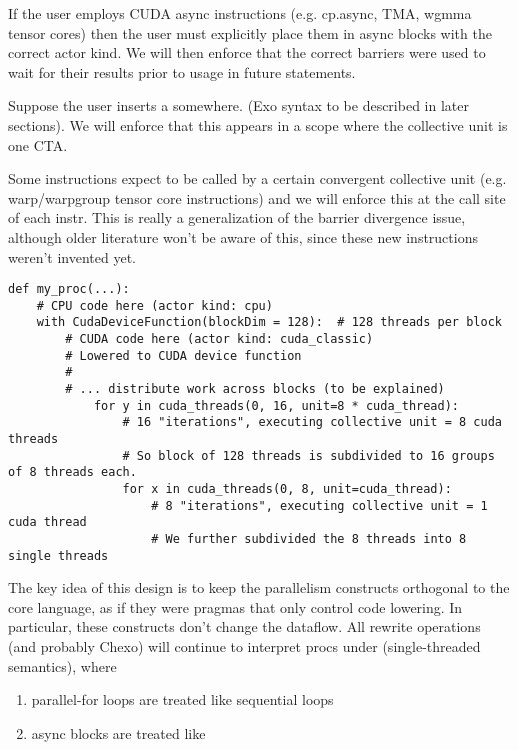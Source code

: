 \filbreak
{} If the user employs CUDA async instructions (e.g. cp.async, TMA, wgmma tensor cores) then the user must explicitly place them in async blocks with the correct actor kind.
We will then enforce that the correct barriers were used to wait for their results prior to usage in future statements.

\filbreak
{} Suppose the user inserts a  somewhere.
(Exo syntax to be described in later sections).
We will enforce that this appears in a scope where the collective unit is one CTA.

\filbreak
{} Some instructions expect to be called by a certain convergent collective unit (e.g. warp/warpgroup tensor core instructions) and we will enforce this at the call site of each instr.
This is really a generalization of the barrier divergence issue, although older literature won't be aware of this, since these new instructions weren't invented yet.

\filbreak
{}
{\color{lightttColor}
\begin{verbatim}
def my_proc(...):
    # CPU code here (actor kind: cpu)
    with CudaDeviceFunction(blockDim = 128):  # 128 threads per block
        # CUDA code here (actor kind: cuda_classic)
        # Lowered to CUDA device function
        #
        # ... distribute work across blocks (to be explained)
            for y in cuda_threads(0, 16, unit=8 * cuda_thread):
                # 16 "iterations", executing collective unit = 8 cuda threads
                # So block of 128 threads is subdivided to 16 groups of 8 threads each.
                for x in cuda_threads(0, 8, unit=cuda_thread):
                    # 8 "iterations", executing collective unit = 1 cuda thread
                    # We further subdivided the 8 threads into 8 single threads

\end{verbatim}
}

\filbreak
{}

The key idea of this design is to keep the parallelism constructs orthogonal to the core language, as if they were pragmas that only control code lowering.
In particular, these constructs don't change the dataflow.
All rewrite operations (and probably Chexo) will continue to interpret procs under  (single-threaded semantics), where
\begin{enumerate}
  \item parallel-for loops are treated like sequential loops
  \item async blocks are treated like 
\end{enumerate}

